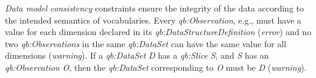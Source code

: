 \documentclass{llncs}
\begin{document}
\emph{Data model consistency} constraints ensure the integrity of
the data according to the intended semantics of vocabularies.
Every \emph{qb:Observation}, e.g., must have a value for each dimension
declared in its \emph{qb:DataStructureDefinition} (\emph{error})
and no two \emph{qb:Observations} in the same \emph{qb:DataSet}
can have the same value for all dimensions (\emph{warning}).
If a \emph{qb:DataSet} \emph{D} has a \emph{qb:Slice} \emph{S}, and \emph{S} has an
\emph{qb:Observation} \emph{O}, then the \emph{qb:DataSet} corresponding to \emph{O} must be \emph{D} (\emph{warning}).
\end{document}
